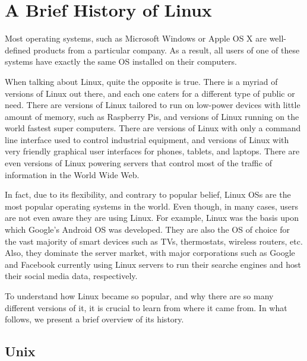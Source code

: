 \chapter{A Brief History of Linux}\label{ch:history}

Most operating systems, such as Microsoft Windows or Apple OS X are well-defined products from a particular company. As a result, all users of one of these systems have exactly the same \acs{OS} installed on their computers.

When talking about Linux, quite the opposite is true. There is a myriad of versions of Linux out there, and each one caters for a different type of public or need. There are versions of Linux tailored to run on low-power devices with little amount of memory, such as Raspberry Pis, and versions of Linux running on the world fastest super computers. There are versions of Linux with only a command line interface used to control industrial equipment, and versions of Linux with very friendly graphical user interfaces for phones, tablets, and laptops. There are even versions of Linux powering servers that control most of the traffic of information in the World Wide Web.

In fact, due to its flexibility, and contrary to popular belief, Linux \acs{OS}s are the most popular operating systems in the world. Even though, in many cases, users are not even aware they are using Linux. For example, Linux was the basis upon which Google's Android \acs{OS} was developed. They are also the \acs{OS} of choice for the vast majority of smart devices such as TVs, thermostats, wireless routers, etc. Also, they dominate the server market, with major corporations such as Google and Facebook currently using Linux servers to run their searche engines and host their social media data, respectively.

To understand how Linux became so popular, and why there are so many different versions of it, it is crucial to learn from where it came from. In what follows, we present a brief overview of its history.

\section{Unix}
\label{sec:unix}


